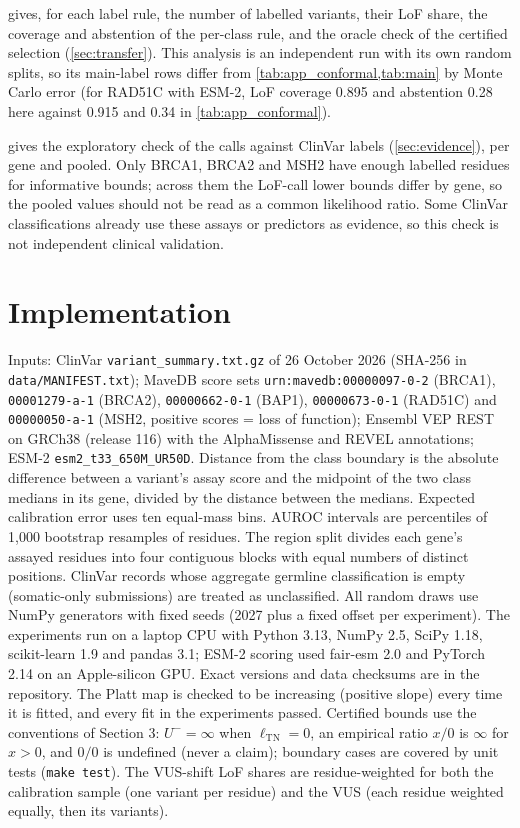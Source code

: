  gives, for each label rule, the number of labelled variants, their LoF share, the coverage and
abstention of the per-class rule, and the oracle check of the certified selection (\cref{sec:transfer}). This analysis
is an independent run with its own random splits, so its main-label rows differ from \cref{tab:app_conformal,tab:main}
by Monte Carlo error (for RAD51C with ESM-2, LoF coverage 0.895 and abstention 0.28 here against 0.915 and 0.34 in
\cref{tab:app_conformal}).



 gives the exploratory check of the calls against ClinVar labels (\cref{sec:evidence}),
per gene and pooled. Only BRCA1, BRCA2 and MSH2 have enough labelled residues for informative bounds; across them the
LoF-call lower bounds differ by gene, so the pooled values should not be read as a common likelihood ratio. Some ClinVar
classifications already use these assays or predictors as evidence, so this check is not independent clinical
validation.



\section{Implementation}\label{s:impl}
Inputs: ClinVar \nolinkurl{variant_summary.txt.gz} of 26 October 2026 (SHA-256 in \nolinkurl{data/MANIFEST.txt});
MaveDB score sets \nolinkurl{urn:mavedb:00000097-0-2} (BRCA1), \nolinkurl{00001279-a-1} (BRCA2), \nolinkurl{00000662-0-1}
(BAP1), \mbox{\nolinkurl{00000673-0-1}} (RAD51C) and \nolinkurl{00000050-a-1} (MSH2, positive scores = loss of function); Ensembl VEP
REST on GRCh38 (release 116) with the AlphaMissense and REVEL annotations; ESM-2 \mbox{\nolinkurl{esm2_t33_650M_UR50D}}.
Distance from the class boundary is the absolute difference between a variant's assay score
and the midpoint of the two class medians in its gene, divided by the distance between the medians. Expected calibration
error uses ten equal-mass bins. AUROC intervals are percentiles of 1,000 bootstrap resamples of residues. The region split
divides each gene's assayed residues into four contiguous blocks with equal numbers of distinct positions. ClinVar records
whose aggregate germline classification is empty (somatic-only submissions) are treated as unclassified. All random
draws use NumPy generators with fixed seeds (2027 plus a fixed offset per experiment). The experiments run on a laptop CPU with Python 3.13, NumPy 2.5,
SciPy 1.18, scikit-learn 1.9 and pandas 3.1; ESM-2 scoring used fair-esm 2.0 and PyTorch 2.14 on an Apple-silicon GPU.
Exact versions and data checksums are in the repository. The Platt map is checked to be increasing (positive
slope) every time it is fitted, and every fit in the experiments passed. Certified bounds use the conventions of
Section 3: $U^-=\infty$ when $\ell_{\mathrm{TN}}=0$, an empirical ratio $x/0$ is $\infty$ for $x>0$, and $0/0$ is
undefined (never a claim); boundary cases are covered by unit tests (\texttt{make test}). The VUS-shift LoF shares
are residue-weighted for both the calibration sample (one variant per residue) and the VUS (each residue weighted
equally, then its variants).

